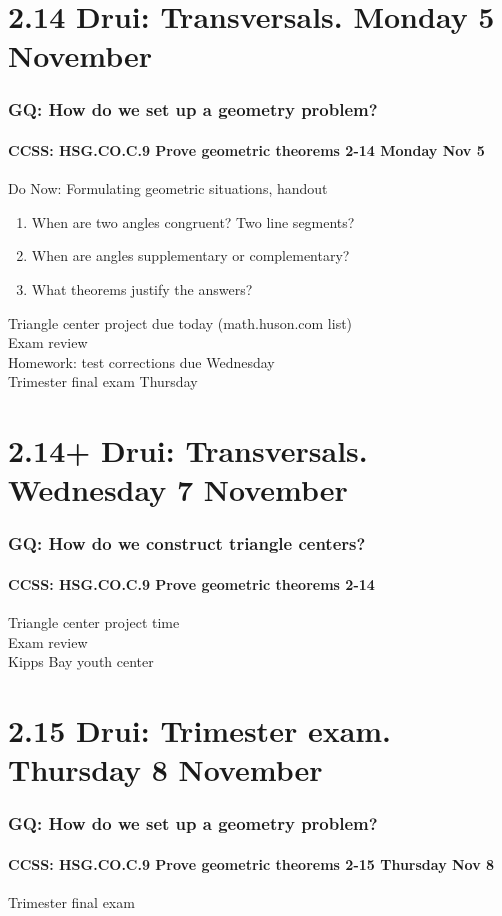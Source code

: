\documentclass{beamer}
\begin{document}
\section{2.14 Drui: Transversals. Monday 5 November}
  \frame
  {
    \frametitle{GQ: How do we set up a geometry problem?}
    \framesubtitle{CCSS: HSG.CO.C.9 Prove geometric theorems  \alert{2-14 Monday Nov 5}}

    \begin{block}{Do Now: Formulating geometric situations, handout}
      \begin{enumerate}
          \item When are two angles congruent? Two line segments?
          \item When are angles supplementary or complementary?
          \item What theorems justify the answers?
      \end{enumerate}
    \end{block}
    Triangle center project due today (math.huson.com list)\\
    Exam review\\
    \vspace{0.2cm}
    Homework: test corrections due Wednesday\\
    Trimester final exam Thursday
    }
\section{2.14+ Drui: Transversals. Wednesday 7 November}
  \frame
  {
    \frametitle{GQ: How do we construct triangle centers?}
    \framesubtitle{CCSS: HSG.CO.C.9 Prove geometric theorems  \alert{2-14}}

    Triangle center project time\\
    Exam review\\
    Kipps Bay youth center
  }

\section{2.15 Drui: Trimester exam. Thursday 8 November}
  \frame
  {
    \frametitle{GQ: How do we set up a geometry problem?}
    \framesubtitle{CCSS: HSG.CO.C.9 Prove geometric theorems  \alert{2-15 Thursday Nov 8}}
    Trimester final exam
  }
\end{document}
